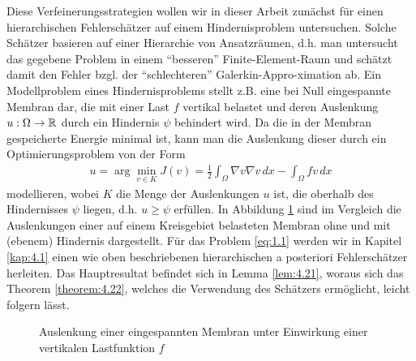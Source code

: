 Diese Verfeinerungsstrategien wollen wir in dieser Arbeit zunächst für einen hierarchischen Fehlerschätzer auf einem Hindernisproblem untersuchen. Solche Schätzer basieren auf einer Hierarchie von Ansatzräumen, d.h. man untersucht das gegebene Problem in einem "`besseren"' Finite-Element-Raum und schätzt damit den Fehler bzgl. der "`schlechteren"' Galerkin-Appro-ximation ab. Ein Modellproblem eines Hindernisproblems stellt z.B. eine bei Null eingespannte Membran dar, die mit einer Last $f$ vertikal belastet und deren Auslenkung $u: \Omega \rightarrow \mathbb{R}$ durch ein Hindernis $\psi$ behindert wird. Da die in der Membran gespeicherte Energie minimal ist, kann man die Auslenkung dieser durch ein Optimierungsproblem von der Form
\begin{align}\label{eq:1.1}
	u = \arg\min_{v \in K} J(v) = \frac 12 \int_{\Omega} \nabla v \nabla v \, dx - \int_\Omega f v \, dx
\end{align}
modellieren, wobei $K$ die Menge der Auslenkungen $u$ ist, die oberhalb des Hindernisses $\psi$ liegen, d.h. $u\ge \psi$ erfüllen.  In Abbildung \ref{abb:1.1} sind im Vergleich die Auslenkungen einer auf einem Kreisgebiet belasteten Membran ohne und mit (ebenem) Hindernis dargestellt. Für das Problem \eqref{eq:1.1} werden wir in Kapitel \ref{kap:4.1} einen wie oben beschriebenen hierarchischen a posteriori Fehlerschätzer herleiten. Das Hauptresultat befindet sich in Lemma \ref{lem:4.21}, woraus sich das Theorem \ref{theorem:4.22}, welches  die Verwendung des Schätzers ermöglicht, leicht folgern lässt.

\begin{figure}[h]
\begin{center}
\hfill
{}
\end{center}
\caption{Auslenkung einer eingespannten Membran unter Einwirkung einer vertikalen Lastfunktion $f$\label{abb:1.1}}
\end{figure}


